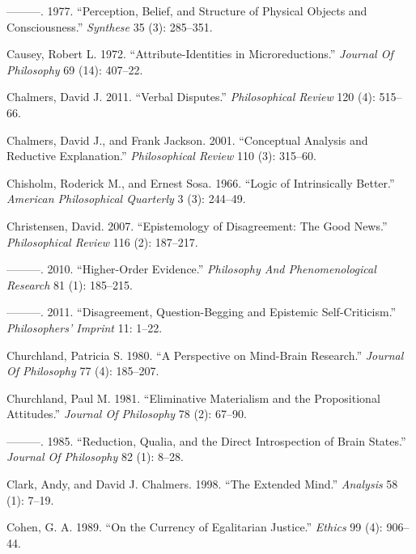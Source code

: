 \documentclass[
  10pt,
  letterpaper,
  DIV=11,
  numbers=noendperiod,
  twoside]{scrartcl}
\newlength{\cslhangindent}
\newenvironment{CSLReferences}[2] %
 {\begin{list}{}{%
  \setlength{\itemindent}{0pt}
  \setlength{\leftmargin}{0pt}
  \setlength{\parsep}{0pt}
  \ifodd #1
   \setlength{\leftmargin}{\cslhangindent}
   \setlength{\itemindent}{-1\cslhangindent}
  \fi
  \setlength{\itemsep}{#2\baselineskip}}}
 {\end{list}}
\begin{document}
\begin{CSLReferences}{1}{0}
---------. 1977. {``Perception, Belief, and Structure of Physical
Objects and Consciousness.''} \emph{Synthese} 35 (3): 285--351.

Causey, Robert L. 1972. {``Attribute-Identities in Microreductions.''}
\emph{Journal Of Philosophy} 69 (14): 407--22.

Chalmers, David J. 2011. {``Verbal Disputes.''} \emph{Philosophical
Review} 120 (4): 515--66.

Chalmers, David J., and Frank Jackson. 2001. {``Conceptual Analysis and
Reductive Explanation.''} \emph{Philosophical Review} 110 (3): 315--60.

Chisholm, Roderick M., and Ernest Sosa. 1966. {``Logic of Intrinsically
Better.''} \emph{American Philosophical Quarterly} 3 (3): 244--49.

Christensen, David. 2007. {``Epistemology of Disagreement: The Good
News.''} \emph{Philosophical Review} 116 (2): 187--217.

---------. 2010. {``Higher-Order Evidence.''} \emph{Philosophy And
Phenomenological Research} 81 (1): 185--215.

---------. 2011. {``Disagreement, Question-Begging and Epistemic
Self-Criticism.''} \emph{Philosophers' Imprint} 11: 1--22.

Churchland, Patricia S. 1980. {``A Perspective on Mind-Brain
Research.''} \emph{Journal Of Philosophy} 77 (4): 185--207.

Churchland, Paul M. 1981. {``Eliminative Materialism and the
Propositional Attitudes.''} \emph{Journal Of Philosophy} 78 (2): 67--90.

---------. 1985. {``Reduction, Qualia, and the Direct Introspection of
Brain States.''} \emph{Journal Of Philosophy} 82 (1): 8--28.

Clark, Andy, and David J. Chalmers. 1998. {``The Extended Mind.''}
\emph{Analysis} 58 (1): 7--19.

Cohen, G. A. 1989. {``On the Currency of Egalitarian Justice.''}
\emph{Ethics} 99 (4): 906--44.


\end{CSLReferences}
\end{document}
